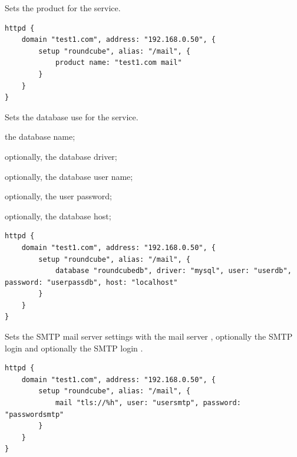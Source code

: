
Sets the product  for the service.

\begin{lstlisting}[style=Java]
httpd {
    domain "test1.com", address: "192.168.0.50", {
        setup "roundcube", alias: "/mail", {
            product name: "test1.com mail"
        }
    }
}
\end{lstlisting}


Sets the database use for the service.
\begin{asparaitem}
\item {} the database name;
\item {} optionally, the database driver;
\item {} optionally, the database user name;
\item {} optionally, the user password;
\item {} optionally, the database host;
\end{asparaitem}

\begin{lstlisting}[style=Java]
httpd {
    domain "test1.com", address: "192.168.0.50", {
        setup "roundcube", alias: "/mail", {
            database "roundcubedb", driver: "mysql", user: "userdb", password: "userpassdb", host: "localhost"
        }
    }
}
\end{lstlisting}


Sets the SMTP mail server settings with the mail server , optionally 
the SMTP login  and optionally the SMTP login .

\begin{lstlisting}[style=Java]
httpd {
    domain "test1.com", address: "192.168.0.50", {
        setup "roundcube", alias: "/mail", {
            mail "tls://%h", user: "usersmtp", password: "passwordsmtp"
        }
    }
}
\end{lstlisting}

